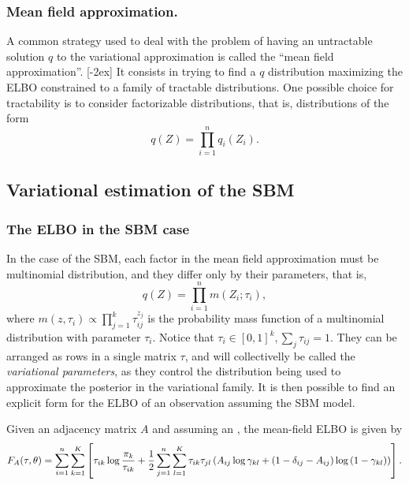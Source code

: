 \documentclass[../../main.tex]{subfiles} %
\begin{document}
\subsubsection{Mean field approximation.} A common strategy used to 
deal 
with the problem of having an untractable solution \(q\) to the variational 
approximation is called the ``mean field approximation''. 
[-2ex] It consists in trying to find a \(q\) 
distribution maximizing the ELBO constrained to a family of tractable 
distributions. One possible choice for tractability is to consider factorizable 
distributions, that is, distributions of the form
\begin{equation*}
	q \left( Z \right) = \prod_{i=1}^{n} q_i \left( Z_i \right).
\end{equation*}

\subsection{Variational estimation of the SBM} 
\label{sec:var-estimation-sbm}
\subsubsection{The ELBO in the SBM case}
In the case of the SBM, each factor in the mean field approximation must be 
multinomial distribution, and they differ only by their parameters, that is,
\begin{equation}
	q \left( Z \right) = \prod_{i=1}^n m \left( Z_i; \tau_i \right),
	\label{eq:mean-field-approx}
\end{equation}
where \(m(z, \tau_i) \propto \prod_{j=1}^{k} \tau_{ij}^{z_j}\) is the 
probability mass function of a multinomial
distribution with parameter \(\tau_i\). Notice that \(\tau_i \in [0, 1]^k, 
\sum_j 
\tau_{ij} = 1\). They can be arranged as rows in a single matrix \(\tau\), and 
will collectivelly be called the \textit{variational parameters}, as they control 
the 
distribution being used to approximate the posterior in the variational 
family. It 
is then possible to find an explicit form for the ELBO of an observation 
assuming the SBM model.

\begin{proposition} \label{prop:mf-elbo}
	Given an adjacency matrix \(A\) and assuming an 
	, the 
	mean-field ELBO is given by
	\begin{dmath}
		F_A (\tau, \theta) = \sum_{i=1}^n \sum_{k=1}^K \left[\tau_{ik}
		\log{\frac{\pi_k}{\tau_{ik}}} \\ + \frac{1}{2} \sum_{j=1}^n \sum_{l=1}^K
		\tau_{ik} \tau_{jl} \left( A_{ij} \log{\gamma_{kl}} + \left( 1 -
		\delta_{ij} - A_{ij}
		\right) \log{\left( 1 - \gamma_{kl} \right)} \right) \right].
		\label{eq:mf-elbo}
	\end{dmath}
\end{proposition}
\end{document}
